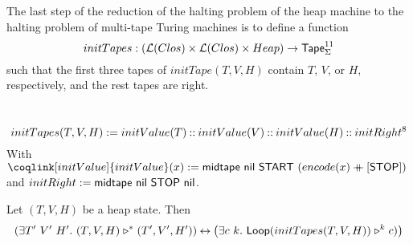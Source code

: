 The last step of the reduction of the halting problem of the heap machine to the halting problem of multi-tape Turing machines is to define a function
\[
  initTapes : \left(\mathcal{L}(Clos) \times \mathcal{L}(Clos) \times Heap\right) \rightarrow \mathsf{Tape}_\Sigma^{11}
\]
such that the first three tapes of $initTape(T,V,H)$ contain $T$, $V$, or $H$, respectively, and the rest tapes are right.

\begin{definition}[$initTapes$][initTapes]
  \label{def:initTapes}
  ~
  \[
    initTapes(T,V,H) := initValue(T) \mathbin{::} initValue(V) \mathbin{::} initValue(H) \mathbin{::} initRight^8
  \]
  With $\coqlink[initValue]{initValue}(x) := \MS{midtape}~\nil~\MS{START}~(encode(x) \app [\MS{STOP}])$ and $initRight := \mathsf{midtape}~\mathsf{nil}~\mathsf{STOP}~\mathsf{nil}$.
\end{definition}

\begin{theorem}
  \label{lem:HaltingProblem}
  Let $(T,V,H)$ be a heap state.  Then
  \[
    \left(\exists T'~V'~H'.~(T,V,H) \mathrel{\triangleright}^* (T',V',H') \right) \mathbin{\leftrightarrow} \left(\exists c~k.~\mathsf{Loop}(initTapes(T,V,H)) \mathrel{\triangleright}^k c)\right)
  \]
\end{theorem}








